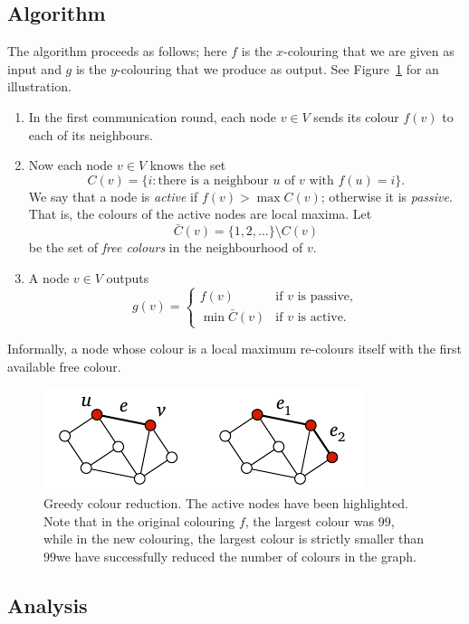 \subsection{Algorithm}

The algorithm proceeds as follows; here $f$ is the $x$-colouring that we are given as input and $g$ is the $y$-colouring that we produce as output. See Figure~\ref{fig:greedy} for an illustration.
\begin{enumerate}
    \item In the first communication round, each node $v \in V$ sends its colour $f(v)$ to each of its neighbours.
    \item Now each node $v \in V$ knows the set
    \[
        C(v) = \{ i : \text{there is a neighbour $u$ of $v$ with $f(u) = i$} \}.
    \]
    We say that a node is \emph{active} if $f(v) > \max C(v)$; otherwise it is \emph{passive}. That is, the colours of the active nodes are local maxima. Let
    \[
        \bar{C}(v) = \{1,2,\dotsc\} \setminus C(v)
    \]
    be the set of \emph{free colours} in the neighbourhood of $v$.
    \item A node $v \in V$ outputs
    \[
        g(v) = \begin{cases}
            f(v) & \text{if $v$ is passive}, \\
            \min \bar{C}(v) & \text{if $v$ is active}.
        \end{cases}
    \]
\end{enumerate}
Informally, a node whose colour is a local maximum re-colours itself with the first available free colour.

\begin{figure}
    \centering
    \includegraphics[page=\PGreedy]{figs.pdf}
    \caption{Greedy colour reduction. The active nodes have been highlighted. Note that in the original colouring $f$, the largest colour was $99$, while in the new colouring, the largest colour is strictly smaller than $99$\mydash we have successfully reduced the number of colours in the graph.}\label{fig:greedy}
\end{figure}

\subsection{Analysis}

